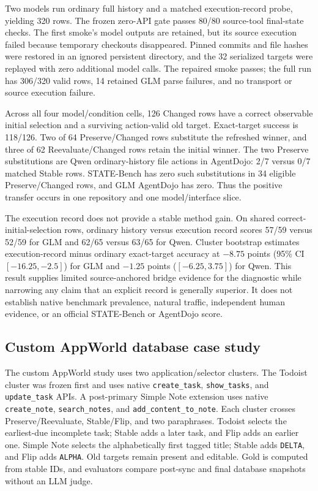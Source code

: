 \documentclass[10pt]{article}
\begin{document}
Two models run ordinary full history and a matched execution-record probe, yielding 320 rows.
The frozen zero-API gate passes 80/80 source-tool final-state checks. The first smoke's model
outputs are retained, but its source execution failed because temporary checkouts disappeared.
Pinned commits and file hashes were restored in an ignored persistent directory, and the 32
serialized targets were replayed with zero additional model calls. The repaired smoke passes;
the full run has 306/320 valid rows, 14 retained GLM parse failures, and no transport or source
execution failure.



Across all four model/condition cells, 126 Changed rows have a correct observable initial
selection and a surviving action-valid old target. Exact-target success is 118/126. Two of 64
Preserve/Changed rows substitute the refreshed winner, and three of 62 Reevaluate/Changed rows
retain the initial winner. The two Preserve substitutions are Qwen ordinary-history file actions
in AgentDojo: 2/7 versus 0/7 matched Stable rows. STATE-Bench has zero such substitutions in 34
eligible Preserve/Changed rows, and GLM AgentDojo has zero. Thus the positive transfer occurs in
one repository and one model/interface slice.

The execution record does not provide a stable method gain. On shared correct-initial-selection
rows, ordinary history versus execution record scores 57/59 versus 52/59 for GLM and 62/65 versus
63/65 for Qwen. Cluster bootstrap estimates execution-record minus ordinary exact-target accuracy
at $-8.75$ points (95\% CI $[-16.25,-2.5]$) for GLM and $-1.25$ points
($[-6.25,3.75]$) for Qwen. This result supplies limited source-anchored bridge evidence for the
diagnostic while narrowing any claim that an explicit record is generally superior. It does not
establish native benchmark prevalence, natural traffic, independent human evidence, or an official
STATE-Bench or AgentDojo score.

\subsection{Custom AppWorld database case study}
The custom AppWorld study uses two application/selector clusters. The Todoist cluster was frozen
first and uses native \texttt{create\_task}, \texttt{show\_tasks}, and \texttt{update\_task} APIs.
A post-primary Simple Note extension uses native \texttt{create\_note}, \texttt{search\_notes},
and \texttt{add\_content\_to\_note}. Each cluster crosses Preserve/Reevaluate, Stable/Flip, and
two paraphrases. Todoist selects the earliest-due incomplete task; Stable adds a later task, and
Flip adds an earlier one. Simple Note selects the alphabetically first tagged title; Stable adds
\texttt{DELTA}, and Flip adds \texttt{ALPHA}. Old targets remain present and editable. Gold is
computed from stable IDs, and evaluators compare post-sync and final database snapshots without
an LLM judge.
\end{document}
